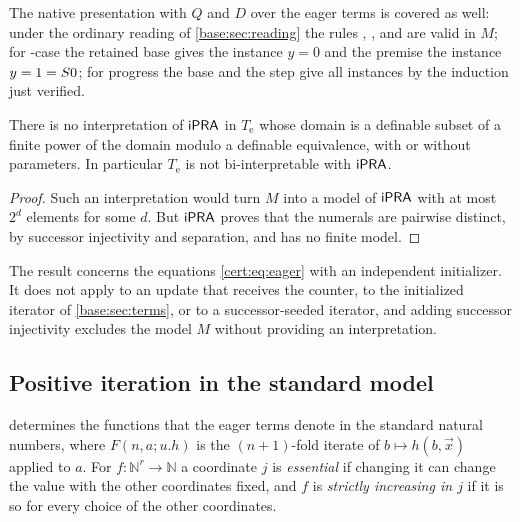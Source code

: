 The native presentation with $Q$ and $D$ over the eager terms is
covered as well: under the ordinary reading of \cref{base:sec:reading} the
rules , ,  and  are valid
in $M$; for -case the retained base gives the instance $y=0$ and
the premise the instance $y=1=S 0$; for progress the base and the step give
all instances by the induction just verified.

\begin{corollary}\label{cert:cor:eager}
There is no interpretation of $\mathsf{iPRA}$ in $T_{\mathrm e}$ whose domain is a
definable subset of a finite power of the domain modulo a definable
equivalence, with or without parameters. In particular $T_{\mathrm e}$ is not
bi-interpretable with $\mathsf{iPRA}$.
\end{corollary}
\begin{proof}
Such an interpretation would turn $M$ into a model of $\mathsf{iPRA}$ with at most
$2^{d}$ elements for some $d$. But $\mathsf{iPRA}$ proves that the numerals are
pairwise distinct, by successor injectivity and separation, and has no finite
model.
\end{proof}

The result concerns the equations \eqref{cert:eq:eager} with an independent
initializer. It does not apply to an update that receives the counter, to the
initialized iterator of \cref{base:sec:terms}, or to a successor-seeded
iterator, and adding successor injectivity excludes the model $M$ without
providing an interpretation.

\subsection{Positive iteration in the standard model}

 determines the functions that the eager terms
denote in the standard natural numbers, where $F(n,a;u.h)$ is the
$(n+1)$-fold iterate of $b\mapsto h(b,\vec x)$ applied to $a$. For
$f\colon\mathbb N^{r}\to\mathbb N$ a coordinate $j$ is \emph{essential} if
changing it can change the value with the other coordinates fixed, and $f$ is
\emph{strictly increasing in $j$} if it is so for every choice of the other
coordinates.

